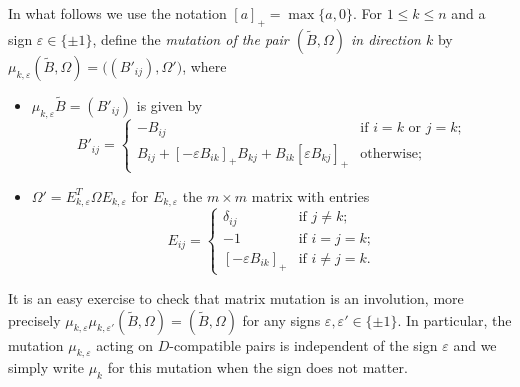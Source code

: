 \documentclass{amsart}
\numberwithin{equation}{section}
\renewcommand{\max}{\operatorname{max}}
\begin{document}
In what follows we use the notation $[a]_+=\max\{a,0\}$.
For $1\le k\le n$ and a sign $\varepsilon\in\{\pm1\}$, define the \emph{mutation of the pair $(\tilde B,\Omega)$ in direction $k$} by $\mu_{k,\varepsilon}(\tilde B,\Omega)=\big((B'_{ij}),\Omega'\big)$, where
\begin{itemize}
  \item $\mu_{k,\varepsilon}\tilde B=(B'_{ij})$ is given by
    \[B'_{ij}=\begin{cases}-B_{ij} & \text{if $i=k$ or $j=k$;}\\ B_{ij}+[-\varepsilon B_{ik}]_+B_{kj}+B_{ik}[\varepsilon B_{kj}]_+ & \text{otherwise;}\end{cases}\]
  \item $\Omega'=E_{k,\varepsilon}^T\Omega E_{k,\varepsilon}$ for $E_{k,\varepsilon}$ the $m\times m$ matrix with entries
    \[E_{ij}=\begin{cases}\delta_{ij} & \text{if $j\ne k$;}\\ -1 & \text{if $i=j=k$;}\\ [-\varepsilon B_{ik}]_+ & \text{if $i\ne j=k$.}\end{cases}\]
\end{itemize}
It is an easy exercise to check that matrix mutation is an involution, more precisely $\mu_{k,\varepsilon}\mu_{k,\varepsilon'}(\tilde B,\Omega)=(\tilde B,\Omega)$ for any signs $\varepsilon,\varepsilon'\in\{\pm1\}$.
In particular, the mutation $\mu_{k,\varepsilon}$ acting on $D$-compatible pairs is independent of the sign $\varepsilon$ and we simply write $\mu_k$ for this mutation when the sign does not matter.
\end{document}

